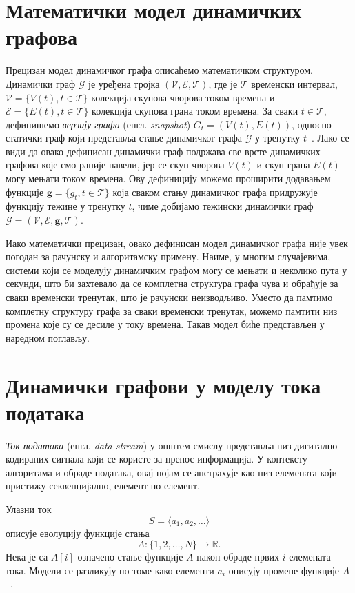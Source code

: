 \section{Математички модел динамичких графова}

Прецизан модел динамичког графа описаћемо математичком структуром. Динамички граф $\mathcal{G}$ је уређена тројка $(\mathcal{V}, \mathcal{E}, \mathcal{T})$, где је $\mathcal{T}$ временски интервал, $\mathcal{V} = \{V(t), t \in \mathcal{T}\}$ колекција скупова чворова током времена и $\mathcal{E} = \{E(t), t \in \mathcal{T}\}$ колекција скупова грана током времена. За сваки $t \in \mathcal{T}$, дефинишемо \textit{верзију графа} (енгл. \textit{snapshot}) $G_t = (V(t), E(t))$, односно статички граф који представља стање динамичког графа $\mathcal{G}$ у тренутку $t$~\cite{survey_on_embedding_dynamic_graphs}. Лако се види да овако дефинисан динамички граф подржава све врсте динамичких графова које смо раније навели, јер се скуп чворова $V(t)$ и скуп грана $E(t)$ могу мењати током времена. Ову дефиницију можемо проширити додавањем функције $\mathbf{g} =\{g_t, t \in \mathcal{T} \}$ која сваком стању динамичког графа придружује функцију тежине у тренутку $t$, чиме добијамо тежински динамички граф $\mathcal{G} = (\mathcal{V}, \mathcal{E}, \mathbf{g}, \mathcal{T})$.

Иако математички прецизан, овако дефинисан модел динамичког графа није увек погодан за рачунску и алгоритамску примену. Наиме, у многим случајевима, системи који се моделују динамичким графом могу се мењати и неколико пута у секунди, што би захтевало да се комплетна структура графа чува и обрађује за сваки временски тренутак, што је рачунски неизводљиво. Уместо да памтимо комплетну структуру графа за сваки временски тренутак, можемо памтити низ промена које су се десиле у току времена. Такав модел биће представљен у наредном поглављу.

\section{Динамички графови у моделу тока података}

\textit{Ток података} (енгл. \textit{data stream}) у општем смислу представља низ дигитално кодираних сигнала који се користе за пренос информација. У контексту алгоритама и обраде података, овај појам се апстрахује као низ елемената који пристижу секвенцијално, елемент по елемент.

Улазни ток
\[
S = \langle a_1, a_2, \ldots \rangle
\]
описује еволуцију функције стања
\[
A : \{1,2,\dots,N\} \to \mathbb{R}.
\]
Нека је са $A[i]$ означено стање функције $A$ након обраде првих $i$
елемената тока. Модели се разликују по томе како елементи $a_i$
описују промене функције $A$~\cite{muthukrishnan2005data}.

